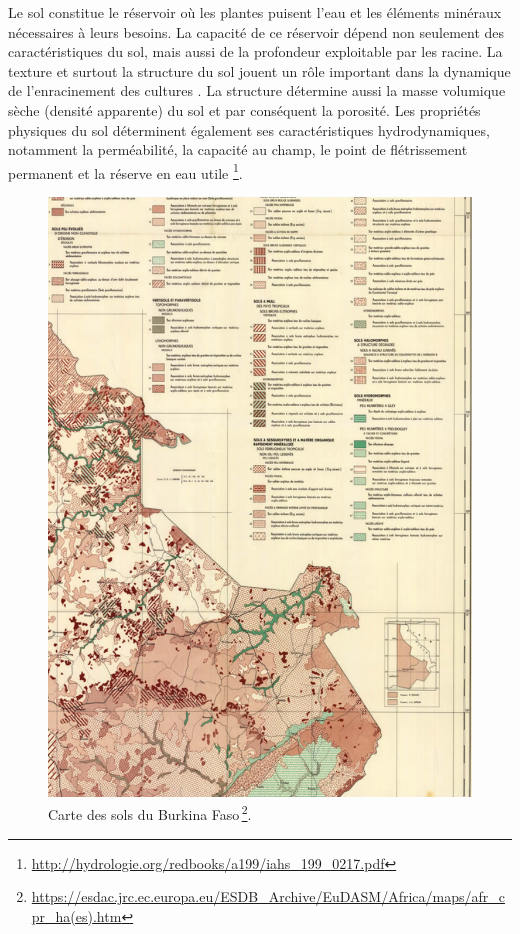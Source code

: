 \documentclass[a4paper,11pt]{article}
\begin{document}
Le sol constitue le réservoir où les plantes puisent l'eau et les
éléments minéraux nécessaires à leurs besoins. La capacité de ce
réservoir dépend non seulement des caractéristiques du sol, mais aussi
de la profondeur exploitable par les racine. La texture et surtout la
structure du sol jouent un rôle important dans la dynamique de
l'enracinement des cultures \cite{Chopart_1980}. La structure
détermine aussi la masse volumique sèche (densité apparente) du sol et
par conséquent la porosité. Les propriétés physiques du sol
déterminent également ses caractéristiques hydrodynamiques, notamment
la perméabilité, la capacité au champ, le point de flétrissement
permanent et la réserve en eau utile
\footnote{\url{http://hydrologie.org/redbooks/a199/iahs_199_0217.pdf}}.


\begin{figure}%
  \begin{center}
    \includegraphics[width=12cm]{images/cartepedobf}
  \end{center}
  \caption{Carte des sols du Burkina Faso\,\protect\footnote{\protect\url{https://esdac.jrc.ec.europa.eu/ESDB_Archive/EuDASM/Africa/maps/afr_cpr_ha(es).htm}}.}
  \label{fig:carte_sols_burkina}
\end{figure}
\end{document}
